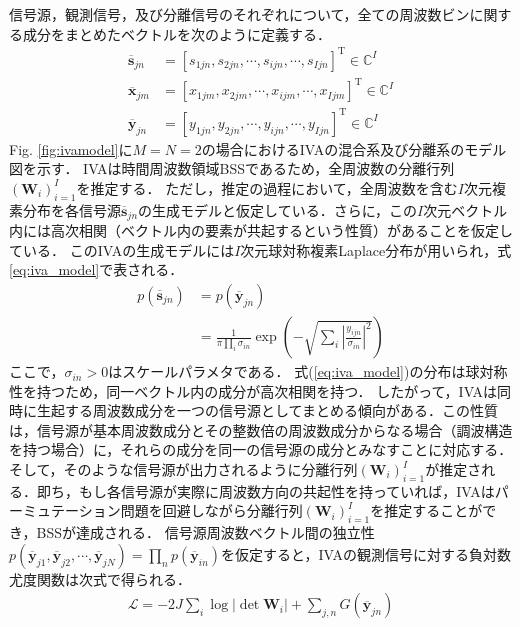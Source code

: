 \documentclass[10.5pt]{jarticle}
\begin{document}
信号源，観測信号，及び分離信号のそれぞれについて，全ての周波数ビンに関する成分をまとめたベクトルを次のように定義する．
\begin{align}
    \overline{\bm{s}}_{jn} &= [s_{1jn}, s_{2jn}, \cdots, s_{ijn}, \cdots, s_{Ijn} ]^{\mathrm{T}} \in \mathbb{C}^{I} \\
    \overline{\bm{x}}_{jm} &= [x_{1jm}, x_{2jm}, \cdots, x_{ijm}, \cdots, x_{Ijm} ]^{\mathrm{T}} \in \mathbb{C}^{I} \\
    \overline{\bm{y}}_{jn} &= [y_{1jn}, y_{2jn}, \cdots, y_{ijn}, \cdots, y_{Ijn} ]^{\mathrm{T}} \in \mathbb{C}^{I}
\end{align}
Fig. \ref{fig:ivamodel}に$M=N=2$の場合におけるIVAの混合系及び分離系のモデル図を示す．
IVAは時間周波数領域BSSであるため，全周波数の分離行列$( \bm{W}_i )_{i=1}^I$を推定する．
ただし，推定の過程において，全周波数を含む$I$次元{複素}分布を各信号源{$\overline{\bm{s}}_{jn}$の生成モデルと仮定している．さらに，この}$I$次元ベクトル内には高次相関（ベクトル内の要素が共起するという性質）があることを仮定している．
このIVAの生成モデルには$I$次元球対称複素Laplace分布が用いられ，式\eqref{eq:iva_model}で表される．
\begin{align}
  \nonumber p(\overline{\bm{s}}_{jn}) &= p(\overline{\bm{y}}_{jn}) \\
&= \frac{1}{\pi \prod_{i} \sigma_{in}} \exp \left(  - \sqrt{ \sum_i \left| \frac{y_{ijn}}{\sigma_{in}} \right|^2}  \right)
\label{eq:iva_model}    
\end{align}
ここで，$\sigma_{in}>0$はスケールパラメタである．
式(\ref{eq:iva_model})の分布は球対称性を持つため，同一ベクトル内の成分が高次相関を持つ\cite{Kim2007_iva}．
したがって，IVAは同時に生起する周波数成分を一つの信号源としてまとめる傾向がある．この性質は，信号源が基本周波数成分とその整数倍の周波数成分からなる場合（調波構造を持つ場合）に，それらの成分を同一の信号源の成分とみなすことに対応する．そして，そのような信号源が出力されるように分離行列$( \bm{W}_i )_{i=1}^I$が推定される．即ち，もし各信号源が実際に周波数方向の共起性を持っていれば，IVAはパーミュテーション問題を回避しながら分離行列$( \bm{W}_i )_{i=1}^I$を推定することができ，BSSが達成される．
信号源周波数ベクトル間の独立性$p(\overline{\bm{y}}_{j1}, \overline{\bm{y}}_{j2}, \cdots, \overline{\bm{y}}_{jN}) = \prod_n p(\overline{\bm{y}}_{in})$を仮定すると，IVAの観測信号に対する負対数尤度関数は次式で得られる．
\begin{align}
    \mathcal{L} = -2J \sum_i \log |\det \bm{W}_i| + \sum_{j,n} G(\overline{\bm{y}}_{jn})
    \label{eq:ivalike}
\end{align}
\end{document}

